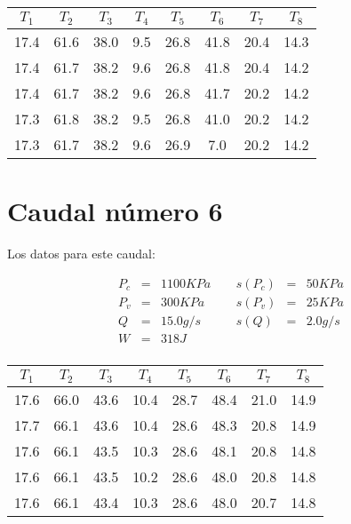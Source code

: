 \documentclass[12pt,a4paper]{article}
\begin{document}
\begin{table}[h!] 	 \centering 
\begin{tabular}{|c|c|c|c|c|c|c|c|} 
\hline 
$T_1$ & $T_2$ & $T_3$ & $T_4$ & $T_5$ & $T_6$ & $T_7$ & $T_8$ \\ \hline 
17.4 & 61.6 & 38.0 & 9.5 & 26.8 & 41.8 & 20.4 & 14.3  \\  
17.4 & 61.7 & 38.2 & 9.6 & 26.8 & 41.8 & 20.4 & 14.2  \\  
17.4 & 61.7 & 38.2 & 9.6 & 26.8 & 41.7 & 20.2 & 14.2  \\  
17.3 & 61.8 & 38.2 & 9.5 & 26.8 & 41.0 & 20.2 & 14.2  \\  
17.3 & 61.7 & 38.2 & 9.6 & 26.9 & 7.0 & 20.2 & 14.2  \\  
\hline 
\end{tabular} 
\label{tab:regresion5} 
\end{table} 
 
 
\section{Caudal número 6} 
 
Los datos para este caudal:  
 
\begin{equation} 
\begin{array}{lllllll}
P_c & = & 1100 KPa &  \ \ &  s(P_c) & =  & 50  KPa \\ 
 P_v & = & 300 KPa &  \ \ &  s(P_v) & =  & 25  KPa\\ 
 Q & = & 15.0 g/s &  \ \ &  s(Q) & =  & 2.0  g/s \\ 
 W & = & 318 J & & & & \\ 
\end{array} 
\end{equation} 
 
\begin{table}[h!] 	 \centering 
\begin{tabular}{|c|c|c|c|c|c|c|c|} 
\hline 
$T_1$ & $T_2$ & $T_3$ & $T_4$ & $T_5$ & $T_6$ & $T_7$ & $T_8$ \\ \hline 
17.6 & 66.0 & 43.6 & 10.4 & 28.7 & 48.4 & 21.0 & 14.9  \\  
17.7 & 66.1 & 43.6 & 10.4 & 28.6 & 48.3 & 20.8 & 14.9  \\  
17.6 & 66.1 & 43.5 & 10.3 & 28.6 & 48.1 & 20.8 & 14.8  \\  
17.6 & 66.1 & 43.5 & 10.2 & 28.6 & 48.0 & 20.8 & 14.8  \\  
17.6 & 66.1 & 43.4 & 10.3 & 28.6 & 48.0 & 20.7 & 14.8  \\  
\hline 
\end{tabular} 
\label{tab:regresion6} 
\end{table} 
 
\end{document}

